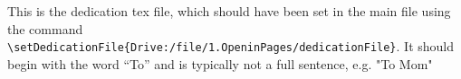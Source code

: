 
This is the dedication tex file, which should have been set in the main file using the command \verb|\setDedicationFile{Drive:/file/1.OpeninPages/dedicationFile}|. It should begin with the word “To” and is typically not a full sentence, e.g. "To Mom"